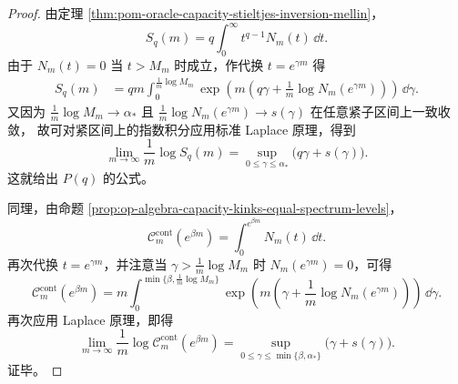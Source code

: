 \begin{proof}
由定理 \ref{thm:pom-oracle-capacity-stieltjes-inversion-mellin}，
\[
S_q(m)=q\int_0^\infty t^{q-1}N_m(t)\,\dd t.
\]
由于 \(N_m(t)=0\) 当 \(t>M_m\) 时成立，作代换 \(t=e^{\gamma m}\) 得
\[
\begin{aligned}
S_q(m)
&=
qm\int_0^{\frac1m\log M_m}
\exp\!\left(
m\left(
q\gamma+\frac{1}{m}\log N_m(e^{\gamma m})
\right)
\right)\,\dd\gamma.
\end{aligned}
\]
又因为
\(
\frac1m\log M_m\to\alpha_\ast
\)
且
\(
\frac1m\log N_m(e^{\gamma m})\to s(\gamma)
\)
在任意紧子区间上一致收敛，
故可对紧区间上的指数积分应用标准 Laplace 原理，得到
\[
\lim_{m\to\infty}\frac{1}{m}\log S_q(m)
=
\sup_{0\le \gamma\le \alpha_\ast}\bigl(q\gamma+s(\gamma)\bigr).
\]
这就给出 \(P(q)\) 的公式。
\par
同理，由命题 \ref{prop:op-algebra-capacity-kinks-equal-spectrum-levels}，
\[
\mathcal C_m^{\mathrm{cont}}(e^{\beta m})
=
\int_0^{e^{\beta m}}N_m(t)\,\dd t.
\]
再次代换 \(t=e^{\gamma m}\)，并注意当 \(\gamma>\frac1m\log M_m\) 时
\(N_m(e^{\gamma m})=0\)，可得
\[
\mathcal C_m^{\mathrm{cont}}(e^{\beta m})
=
m\int_0^{\min\{\beta,\frac1m\log M_m\}}
\exp\!\left(
m\left(
\gamma+\frac{1}{m}\log N_m(e^{\gamma m})
\right)
\right)\,\dd\gamma.
\]
再次应用 Laplace 原理，即得
\[
\lim_{m\to\infty}\frac{1}{m}\log \mathcal C_m^{\mathrm{cont}}(e^{\beta m})
=
\sup_{0\le \gamma\le \min\{\beta,\alpha_\ast\}}
\bigl(\gamma+s(\gamma)\bigr).
\]
证毕。
\end{proof}

